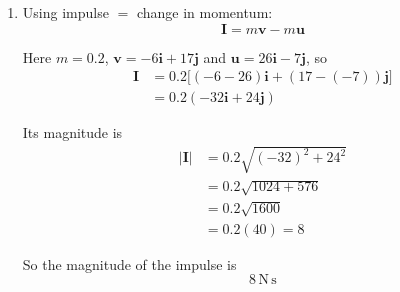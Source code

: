 \documentclass[leqno]{article}
\begin{document}
\begin{enumerate}[
  label=\textbf{\arabic*.},
  leftmargin=*,
  topsep=0pt,
  partopsep=0pt,
  parsep=0pt
]
\begin{djsSolution}
\begin{enumerate}[label=\textbf{(\alph*)}]
  Substituting for $\hat{\mathbf{t}}$ and $\hat{\mathbf{n}}$:
  \begin{align*}
  \mathbf{v}
  &=10\left(\frac{3\mathbf{i}+4\mathbf{j}}{5}\right)-15\left(\frac{4\mathbf{i}-3\mathbf{j}}{5}\right)\\
  &=2(3\mathbf{i}+4\mathbf{j})-3(4\mathbf{i}-3\mathbf{j})\\
  &=(6\mathbf{i}+8\mathbf{j})-(12\mathbf{i}-9\mathbf{j})\\
  &=-6\mathbf{i}+17\mathbf{j}
  \end{align*}


  \item Using impulse \(=\) change in momentum:
  \[
  \mathbf{I}=m\mathbf{v}-m\mathbf{u}
  \]

  Here $m=0.2$, $\mathbf{v}=-6\mathbf{i}+17\mathbf{j}$ and $\mathbf{u}=26\mathbf{i}-7\mathbf{j}$, so
  \begin{align*}
  \mathbf{I}
  &=0.2\big[(-6-26)\mathbf{i}+(17-(-7))\mathbf{j}\big]\\
  &=0.2(-32\mathbf{i}+24\mathbf{j})
  \end{align*}

  Its magnitude is
  \begin{align*}
  |\mathbf{I}|
  &=0.2\sqrt{(-32)^2+24^2}\\
  &=0.2\sqrt{1024+576}\\
  &=0.2\sqrt{1600}\\
  &=0.2(40)=8
  \end{align*}

  So the magnitude of the impulse is
  \[
  8\,\mathrm{N\,s}
  \]
\end{enumerate}
\end{djsSolution}


\newpage

\questionitem

\begin{figure}[H]
    \centering
{}
\end{figure}
\end{enumerate}
\end{document}
